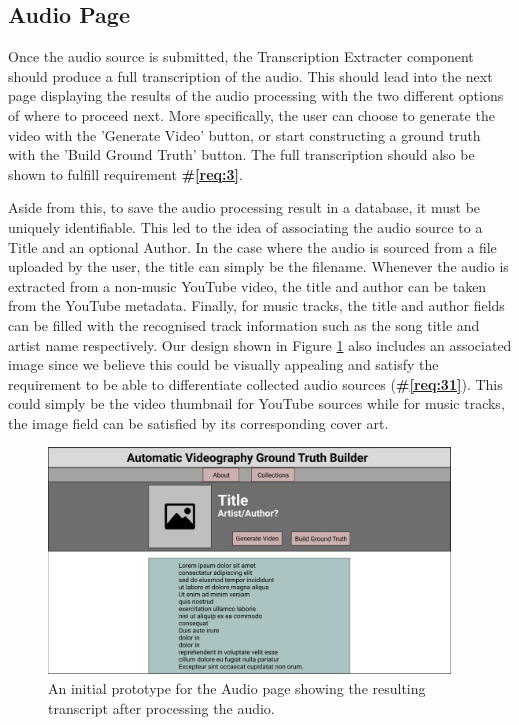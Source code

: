 \documentclass{l4proj}
\begin{document}
\subsection{Audio Page}
Once the audio source is submitted, the Transcription Extracter component should produce a full transcription of the audio. This should lead into the next page displaying the results of the audio processing with the two different options of where to proceed next. More specifically, the user can choose to generate the video with the 'Generate Video' button, or start constructing a ground truth with the 'Build Ground Truth' button. The full transcription should also be shown to fulfill requirement \textbf{\#\ref{req:3}}. 

Aside from this, to save the audio processing result in a database, it must be uniquely identifiable. This led to the idea of associating the audio source to a Title and an optional Author. In the case where the audio is sourced from a file uploaded by the user, the title can simply be the filename. Whenever the audio is extracted from a non-music YouTube video, the title and author can be taken from the YouTube metadata. Finally, for music tracks, the title and author fields can be filled with the recognised track information such as the song title and artist name respectively. Our design shown in Figure \ref{fig:audio_page} also includes an associated image since we believe this could be visually appealing and satisfy the requirement to be able to differentiate collected audio sources (\textbf{\#\ref{req:31}}). This could simply be the video thumbnail for YouTube sources while for music tracks, the image field can be satisfied by its corresponding cover art. 

\begin{figure}
    \centering
    \includegraphics[width=0.95\textwidth]{figures/audio_page.pdf}
    \caption{An initial prototype for the Audio page showing the resulting transcript after processing the audio.}
    \label{fig:audio_page}
\end{figure}
\end{document}
